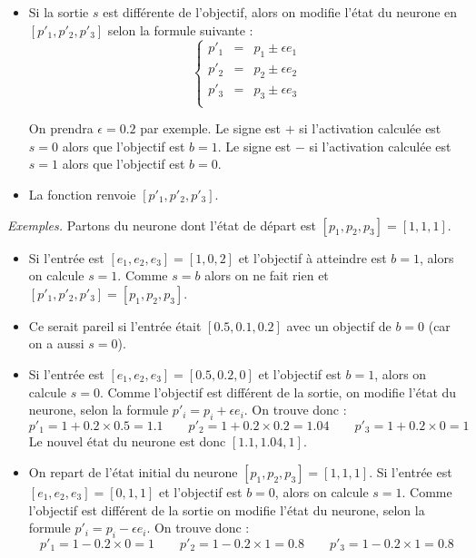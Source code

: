 \documentclass[11pt,class=report,crop=false]{standalone}
\begin{document}
\begin{activite}[Neurone]
\begin{enumerate}
\begin{itemize}
		\item Si la sortie $s$ est différente de l'objectif, alors on modifie l'état du neurone en $[p'_1,p'_2,p'_3]$ selon la formule suivante :
		$$\left\{ 
		\begin{array}{rcl}
		p'_1 &=& p_1 \pm \epsilon e_1 \\
		p'_2 &=& p_2 \pm \epsilon e_2 \\
		p'_3 &=& p_3 \pm \epsilon e_3 \\
		\end{array}
		\right.$$		

		On prendra $\epsilon = 0.2$ par exemple.
		Le signe est \og{}$+$\fg{} si l'activation calculée est $s=0$ alors que l'objectif est $b=1$.
		Le signe est \og{}$-$\fg{} si l'activation calculée est $s=1$ alors que l'objectif est $b=0$.
		
		\item La fonction renvoie $[p'_1,p'_2,p'_3]$.
	\end{itemize}			
		
	\medskip
	
	\emph{Exemples.}
	Partons du neurone dont l'état de départ  est $[p_1,p_2,p_3] = [1,1,1]$.
	\begin{itemize}
		\item Si l'entrée est $[e_1,e_2,e_3] = [1,0,2]$ et l'objectif à atteindre est $b=1$, alors on calcule $s=1$.
		Comme $s=b$ alors on ne fait rien et $[p'_1,p'_2,p'_3] = [p_1,p_2,p_3]$.
		
		\item Ce serait pareil si l'entrée était $[0.5,0.1,0.2]$ avec un objectif de $b=0$ (car on a aussi $s=0$).
		
		\item Si l'entrée est $[e_1,e_2,e_3] = [0.5,0.2,0]$ et l'objectif est $b=1$, alors on calcule $s=0$.
		Comme l'objectif est différent de la sortie, on modifie l'état du neurone, selon la formule 
		$p'_i = p_i + \epsilon e_i$. On trouve donc :
	$$p'_1 = 1 + 0.2 \times 0.5 = 1.1 \qquad p'_2 = 1 + 0.2 \times 0.2 = 1.04 \qquad p'_3 = 1 + 0.2 \times 0 = 1$$
		Le nouvel état du neurone est donc $[1.1,1.04,1]$.

		
		\item On repart de l'état initial du neurone $[p_1,p_2,p_3] = [1,1,1]$.
		Si l'entrée est $[e_1,e_2,e_3] = [0,1,1]$ et l'objectif est $b=0$, alors on calcule $s=1$.
		Comme l'objectif est différent de la sortie on modifie l'état du neurone, selon la formule 
		$p'_i = p_i - \epsilon e_i$. On trouve donc :
		$$p'_1 = 1 - 0.2 \times 0 = 1 \qquad p'_2 = 1 - 0.2 \times 1 = 0.8 \qquad p'_3 = 1 - 0.2 \times 1 = 0.8$$
		

\end{itemize}
\end{enumerate}
\end{activite}
\end{document}
